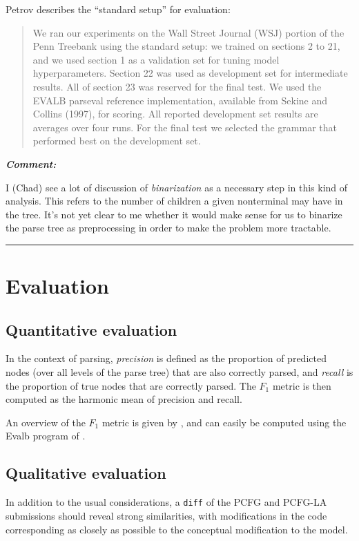 \documentclass[english]{article}
\renewenvironment{comment}
    {%
     \par\medskip\noindent
     \tabularx{\textwidth}{|>{\columncolor[gray]{0.9}}X|}
     \hline
     \emph{\textbf{Comment:}}%
    }
    {%
     \endtabularx\hrule\par\medskip
    }
\begin{document}
Petrov describes the ``standard setup'' for evaluation:
\begin{quote}
We ran our experiments on the Wall Street Journal (WSJ) portion of the Penn Treebank using the standard setup: we trained on sections 2 to 21, and we used section 1 as a validation set for tuning model hyperparameters. Section 22 was used as development set for intermediate results. All of section 23 was reserved for the final test. We used the EVALB parseval reference implementation, available from Sekine and Collins (1997), for scoring. All reported development set results are averages over four runs. For the final test we selected the grammar that performed best on the development set.
\end{quote}
\begin{comment}
I (Chad) see a lot of discussion of \emph{binarization} as a necessary step in this kind of analysis. This refers to the number of children a given nonterminal may have in the tree. It's not yet clear to me whether it would make sense for us to binarize the parse tree as preprocessing in order to make the problem more tractable.
\end{comment}



\section{Evaluation}


\subsection{Quantitative evaluation}

In the context of parsing, \emph{precision} is defined as the proportion of predicted nodes (over all levels of the parse tree) that are also correctly parsed, and \emph{recall} is the proportion of true nodes that are correctly parsed. The $F_{1}$ metric is then computed as the harmonic mean of precision and recall.

An overview of the $F_{1}$ metric is given by \citet{Manning2012a}, and can easily be computed using the Evalb program of \citet{Sekine1997}.

\subsection{Qualitative evaluation}

In addition to the usual considerations, a \texttt{diff} of the PCFG and PCFG-LA submissions should reveal strong similarities, with modifications in the code corresponding as closely as possible to the conceptual modification to the model. 


\end{document}
